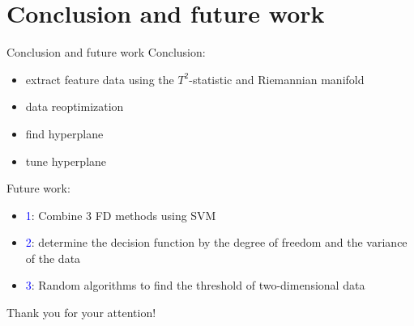\documentclass[10pt]{beamer}
\begin{document}
\section{Conclusion and future work}

\begin{frame}{Conclusion and future work}
Conclusion:
\begin{itemize}
    \item extract feature data using the $T^2$-statistic and Riemannian manifold
    \item data reoptimization
    \item find hyperplane
    \item tune hyperplane
\end{itemize}
Future work:
     \begin{itemize}
      \item \textcolor{blue}{1}: Combine 3 FD methods using SVM
        \item \textcolor{blue}{2}: determine the decision function by the degree of freedom and the variance of the data
      \item \textcolor{blue}{3}: Random algorithms to find the threshold of two-dimensional data 
 	 \end{itemize}  
\end{frame}

\begin{frame}[standout]
\begin{center}
Thank you for your attention!
\end{center}
\end{frame}
\end{document}
